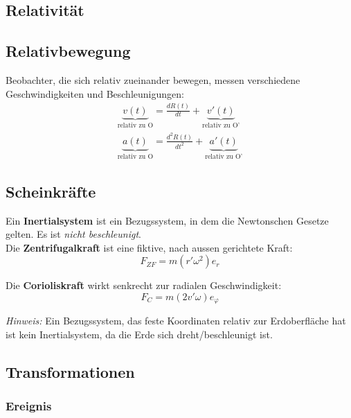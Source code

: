 \documentclass[7pt]{article}
\begin{document}
\begin{multicols*}{3}

\section{Relativit{\"a}t}

\subsection{Relativbewegung}

Beobachter, die sich relativ zueinander bewegen, messen verschiedene Geschwindigkeiten und Beschleunigungen:
\begin{equation*}
\begin{array}{ll}
	\underbrace{v(t)}_\text{relativ zu O} = \frac{dR(t)}{dt} + \underbrace{v'(t)}_\text{relativ zu O'} \\
	\underbrace{a(t)}_\text{relativ zu O} = \frac{d^2R(t)}{dt^2} + \underbrace{a'(t)}_\text{relativ zu O'}
\end{array}
\end{equation*}

\subsection{Scheinkr{\"a}fte}

Ein \textbf{Inertialsystem} ist ein Bezugssystem, in dem die Newtonschen Gesetze gelten. Es ist \emph{nicht beschleunigt}. \\

Die \textbf{Zentrifugalkraft} ist eine fiktive, nach aussen gerichtete Kraft:
\begin{equation*}
	F_{ZF} = m(r'\omega^2)e_r
\end{equation*}

Die \textbf{Corioliskraft} wirkt senkrecht zur radialen Geschwindigkeit:
\begin{equation*}
	F_C = m(2v'\omega)e_\varphi
\end{equation*}

\emph{Hinweis:} Ein Bezugssystem, das feste Koordinaten relativ zur Erdoberfl{\"a}che hat ist kein Inertialsystem, da die Erde sich dreht/beschleunigt ist.

\subsection{Transformationen}

\subsubsection{Ereignis}


\end{multicols*}
\end{document}
